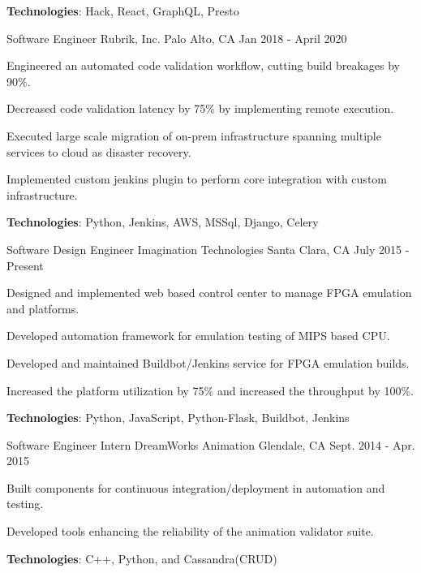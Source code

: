 \begin{cventries}
{\begin{cvitems}
        \item {\textbf{Technologies}: Hack, React, GraphQL, Presto}
      \end{cvitems}
    }
    {}
    {}
  \cventry
    {Software Engineer}
    {Rubrik, Inc.}
    {Palo Alto, CA}
    {Jan 2018 - April 2020}
    {
      \begin{cvitems}
        \item {Engineered an automated code validation workflow, cutting build breakages by 90\%.}
        \item {Decreased code validation latency by 75\% by implementing remote execution.}
        \item {Executed large scale migration of on-prem infrastructure spanning multiple services to cloud as disaster recovery.}
        \item {Implemented custom jenkins plugin to perform core integration with custom infrastructure.}
        \item {\textbf{Technologies}: Python, Jenkins, AWS, MSSql, Django, Celery}
      \end{cvitems}
    }
    {}
    {}
  \cventry
    {Software Design Engineer}
    {Imagination Technologies}
    {Santa Clara, CA}
    {July 2015 - Present}
    {
      \begin{cvitems}
        \item {Designed and implemented web based control center to manage FPGA emulation and platforms.}
        \item {Developed automation framework for emulation testing of MIPS based CPU.}                
        \item {Developed and maintained Buildbot/Jenkins service for FPGA emulation builds.}
        \item {Increased the platform utilization by 75\% and increased the throughput by 100\%.}
        \item {\textbf{Technologies}: Python, JavaScript, Python-Flask, Buildbot, Jenkins}
      \end{cvitems}
    }
    {}
    {}
  \cventry
    {Software Engineer Intern}
    {DreamWorks Animation}
    {Glendale, CA}
    {Sept. 2014 - Apr. 2015}
    {
      \begin{cvitems}
        \item {Built components for continuous integration/deployment in automation and testing.}
        \item {Developed tools enhancing the reliability of the animation validator suite.}
        \item {\textbf{Technologies}: C++, Python, and Cassandra(CRUD)}

\end{cvitems}}
\end{cventries}
